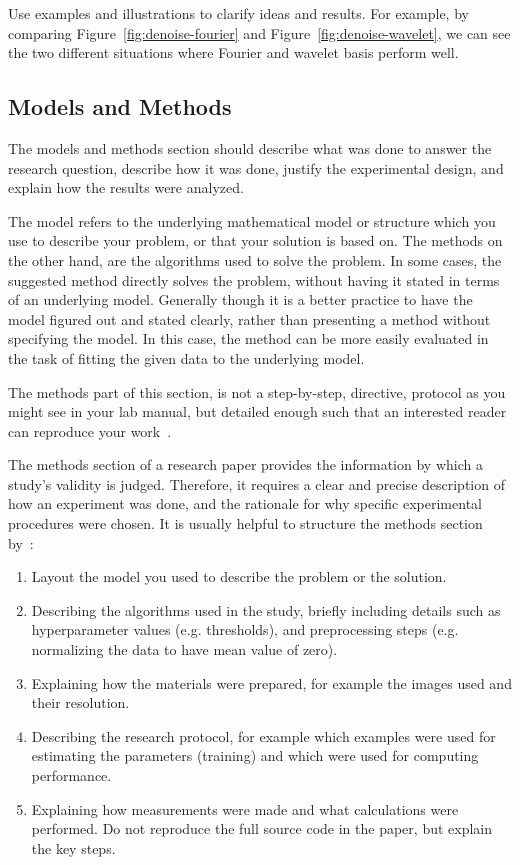 \documentclass[10pt,conference,compsocconf]{IEEEtran}
\begin{document}
	Use examples and illustrations to clarify ideas and results. For
	example, by comparing Figure~\ref{fig:denoise-fourier} and
	Figure~\ref{fig:denoise-wavelet}, we can see the two different
	situations where Fourier and wavelet basis perform well. 
	
	\subsection{Models and Methods}
	The models and methods
	section should describe what was
	done to answer the research question, describe how it was done,
	justify the experimental design, and
	explain how the results were analyzed.
	
	The model refers to the underlying mathematical model or structure which 
	you use to describe your problem, or that your solution is based on. 
	The methods on the other hand, are the algorithms used to solve the problem. 
	In some cases, the suggested method directly solves the problem, without having it 
	stated in terms of an underlying model. Generally though it is a better practice to have 
	the model figured out and stated clearly, rather than presenting a method without specifying 
	the model. In this case, the method can be more easily evaluated in the task of fitting 
	the given data to the underlying model.
	
	The methods part of this section, is not a step-by-step, directive,
	protocol as you might see in your lab manual, but detailed enough such
	that an interested reader can reproduce your
	work~\cite{anderson04,wavelab}.
	
	The methods section of a research paper provides the information by
	which a study's validity is judged.
	Therefore, it requires a clear and precise description of how an
	experiment was done, and the rationale
	for why specific experimental procedures were chosen.
	It is usually helpful to
	structure the methods section by~\cite{kallet04methods}:
	\begin{enumerate}
		\item Layout the model you used to describe the problem or the solution.
		\item Describing the algorithms used in the study, briefly including
		details such as hyperparameter values (e.g. thresholds), and
		preprocessing steps (e.g. normalizing the data to have mean value of
		zero).
		\item Explaining how the materials were prepared, for example the
		images used and their resolution.
		\item Describing the research protocol, for example which examples
		were used for estimating the parameters (training) and which were
		used for computing performance.
		\item Explaining how measurements were made and what
		calculations were performed. Do not reproduce the full source code in
		the paper, but explain the key steps.
	\end{enumerate}
	
\end{document}
